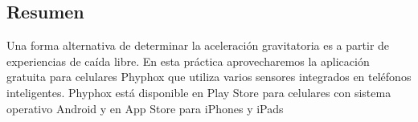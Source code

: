 \begin{center}
\section*{Resumen}
\footnotesize{Una forma alternativa de determinar la aceleración gravitatoria es a partir de experiencias de caída libre. En esta práctica aprovecharemos la aplicación gratuita para celulares Phyphox que utiliza varios sensores integrados en teléfonos inteligentes. Phyphox está disponible en Play Store para celulares con sistema operativo Android y en App Store para iPhones y iPads}
\end{center}


     

    


